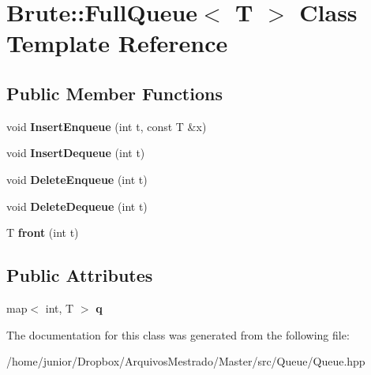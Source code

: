 \hypertarget{classBrute_1_1FullQueue}{}\section{Brute\+:\+:Full\+Queue$<$ T $>$ Class Template Reference}
\label{classBrute_1_1FullQueue}
\subsection*{Public Member Functions}
\begin{DoxyCompactItemize}
\item 
\mbox{\label{classBrute_1_1FullQueue_a66fc3903f5ed07f915aa46647c90e13e}} 
void {\bfseries Insert\+Enqueue} (int t, const T \&x)
\item 
\mbox{\label{classBrute_1_1FullQueue_a6e8ca9970051d1965566dc296973ac1d}} 
void {\bfseries Insert\+Dequeue} (int t)
\item 
\mbox{\label{classBrute_1_1FullQueue_a4bcd30eecb8f5120ddb680473890474b}} 
void {\bfseries Delete\+Enqueue} (int t)
\item 
\mbox{\label{classBrute_1_1FullQueue_ad7bb857a2d3ef1d21399985e6624eed4}} 
void {\bfseries Delete\+Dequeue} (int t)
\item 
\mbox{\label{classBrute_1_1FullQueue_a36660da3e77471d20bb6db71537a01f1}} 
T {\bfseries front} (int t)
\end{DoxyCompactItemize}
\subsection*{Public Attributes}
\begin{DoxyCompactItemize}
\item 
\mbox{\label{classBrute_1_1FullQueue_abb0b0982e0ef77dcd93a04003041f0a4}} 
map$<$ int, T $>$ {\bfseries q}
\end{DoxyCompactItemize}


The documentation for this class was generated from the following file\+:\begin{DoxyCompactItemize}
\item 
/home/junior/\+Dropbox/\+Arquivos\+Mestrado/\+Master/src/\+Queue/Queue.\+hpp\end{DoxyCompactItemize}
